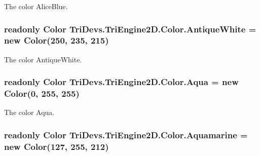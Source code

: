 The color Alice\-Blue. 

\hypertarget{struct_tri_devs_1_1_tri_engine2_d_1_1_color_a980b4b8d86eff9b3ea3617684998bfad}{
\subsubsection[{Antique\-White}]{\setlength{\rightskip}{0pt plus 5cm}readonly {\bf Color} Tri\-Devs.\-Tri\-Engine2\-D.\-Color.\-Antique\-White = new {\bf Color}(250, 235, 215)\hspace{0.3cm}{\ttfamily [static]}}}\label{struct_tri_devs_1_1_tri_engine2_d_1_1_color_a980b4b8d86eff9b3ea3617684998bfad}


The color Antique\-White. 

\hypertarget{struct_tri_devs_1_1_tri_engine2_d_1_1_color_a60476dad6dcdbde416c8b5061582563f}{
\subsubsection[{Aqua}]{\setlength{\rightskip}{0pt plus 5cm}readonly {\bf Color} Tri\-Devs.\-Tri\-Engine2\-D.\-Color.\-Aqua = new {\bf Color}(0, 255, 255)\hspace{0.3cm}{\ttfamily [static]}}}\label{struct_tri_devs_1_1_tri_engine2_d_1_1_color_a60476dad6dcdbde416c8b5061582563f}


The color Aqua. 

\hypertarget{struct_tri_devs_1_1_tri_engine2_d_1_1_color_a8bf584eadbc06e467b7738583178487a}{
\subsubsection[{Aquamarine}]{\setlength{\rightskip}{0pt plus 5cm}readonly {\bf Color} Tri\-Devs.\-Tri\-Engine2\-D.\-Color.\-Aquamarine = new {\bf Color}(127, 255, 212)\hspace{0.3cm}{\ttfamily [static]}}}\label{struct_tri_devs_1_1_tri_engine2_d_1_1_color_a8bf584eadbc06e467b7738583178487a}


